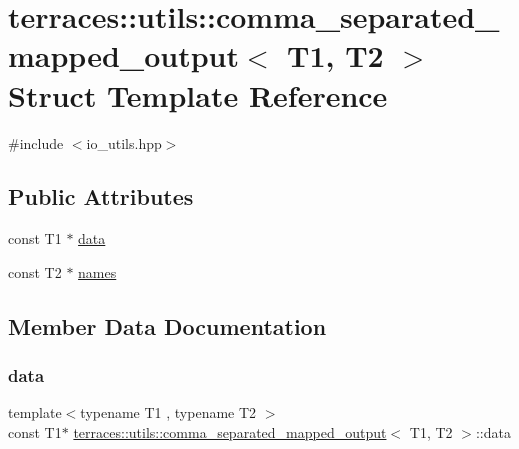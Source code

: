 \hypertarget{structterraces_1_1utils_1_1comma__separated__mapped__output}{}\section{terraces\+:\+:utils\+:\+:comma\+\_\+separated\+\_\+mapped\+\_\+output$<$ T1, T2 $>$ Struct Template Reference}
\label{structterraces_1_1utils_1_1comma__separated__mapped__output}


{\ttfamily \#include $<$io\+\_\+utils.\+hpp$>$}

\subsection*{Public Attributes}
\begin{DoxyCompactItemize}
\item 
const T1 $\ast$ \hyperlink{structterraces_1_1utils_1_1comma__separated__mapped__output_a94793bacf4ae120f9739de1eb3499a77}{data}
\item 
const T2 $\ast$ \hyperlink{structterraces_1_1utils_1_1comma__separated__mapped__output_aff76c42bae39a26d7b19932ad1c3f324}{names}
\end{DoxyCompactItemize}


\subsection{Member Data Documentation}
\mbox{\label{structterraces_1_1utils_1_1comma__separated__mapped__output_a94793bacf4ae120f9739de1eb3499a77}} 
\subsubsection{\texorpdfstring{data}{data}}
{\footnotesize\ttfamily template$<$typename T1 , typename T2 $>$ \\
const T1$\ast$ \hyperlink{structterraces_1_1utils_1_1comma__separated__mapped__output}{terraces\+::utils\+::comma\+\_\+separated\+\_\+mapped\+\_\+output}$<$ T1, T2 $>$\+::data}

